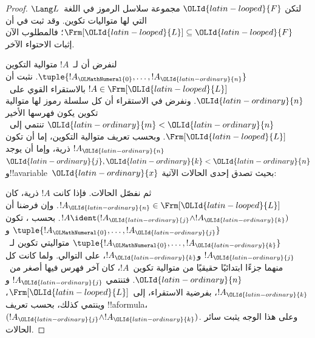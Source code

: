 \documentclass[../../../include/open-logic-section]{subfiles}
\begin{document}
\begin{proof}
لتكن $\OLId{latin-looped}{F}$ مجموعة سلاسل الرموز في اللغة~$\Lang L$ التي لها
متواليات تكوين. وقد ثبت في
 أن $\Frm[\OLId{latin-looped}{L}] \subseteq \OLId{latin-looped}{F}$؛
فالمطلوب الآن إثبات الاحتواء الآخر.

لنفرض أن لـ~$!A$ متوالية التكوين
$\tuple{!A_\OLMathNumeral{0},\dotsc,!A_\OLId{latin-ordinary}{n}}$. نثبت أن $!A \in \Frm[\OLId{latin-looped}{L}]$ بالاستقراء
القوي على~$\OLId{latin-ordinary}{n}$. ونفرض في الاستقراء أن كل سلسلة رموز لها متوالية
تكوين يكون فهرسها الأخير $\OLId{latin-ordinary}{m} < \OLId{latin-ordinary}{n}$ تنتمي إلى~$\Frm[\OLId{latin-looped}{L}]$. وبحسب تعريف
متوالية التكوين، إما أن تكون $!A_\OLId{latin-ordinary}{n}$ ذرية، وإما أن يوجد $\OLId{latin-ordinary}{j},\OLId{latin-ordinary}{k} < \OLId{latin-ordinary}{n}$
و!!a{variable}~$\OLId{latin-ordinary}{x}$ بحيث تصدق إحدى الحالات الآتية:
\begin{enumerate}
\end{enumerate}
ثم نفصّل الحالات. فإذا كانت $!A$ ذرية، كان
$!A_\OLId{latin-ordinary}{n} \in \Frm[\OLId{latin-looped}{L}]$. وإن فرضنا أن
$!A \ident (!A_\OLId{latin-ordinary}{j} \land !A_\OLId{latin-ordinary}{k})$. بحسب
،
تكون $\tuple{!A_\OLMathNumeral{0},\dotsc,!A_\OLId{latin-ordinary}{j}}$ و$\tuple{!A_\OLMathNumeral{0},\dotsc,!A_\OLId{latin-ordinary}{k}}$
متواليتي تكوين لـ~$!A_\OLId{latin-ordinary}{j}$ و$!A_\OLId{latin-ordinary}{k}$، على التوالي. ولما كانت كل منهما جزءًا ابتدائيًا حقيقيًا من متوالية تكوين~$!A$،
كان آخر فهرس فيها أصغر من~$\OLId{latin-ordinary}{n}$. فتنتمي $!A_\OLId{latin-ordinary}{j}$ و$!A_\OLId{latin-ordinary}{k}$، بفرضية
الاستقراء، إلى~$\Frm[\OLId{latin-looped}{L}]$، وينتمي كذلك، بحسب تعريف !!a{formula}،
$(!A_\OLId{latin-ordinary}{j} \land !A_\OLId{latin-ordinary}{k})$. وعلى هذا الوجه يثبت سائر الحالات.
\end{proof}
\end{document}
